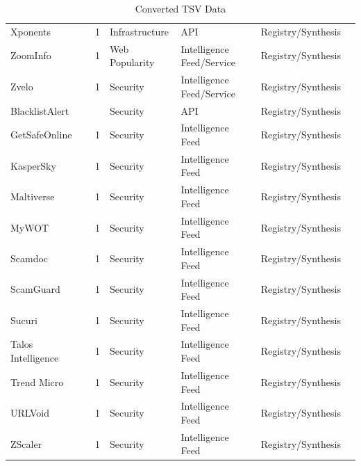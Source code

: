 \begin{table}[h!]
\begin{tabular}{lllllll}
Xponents & \cite{xponent} & 1 & Infrastructure & API & Registry/Synthesis & \cite{10.1145/3618257.3624816} \\
ZoomInfo & \cite{zoominfo} & 1 & Web Popularity & Intelligence Feed/Service & Registry/Synthesis & \cite{10.1145/3487552.3487853} \\
Zvelo & \cite{zvelo} & 1 & Security & Intelligence Feed/Service & Registry/Synthesis & \cite{10.1145/3487552.3487853} \\
BlacklistAlert & \cite{blacklistalert} &  & Security & API & Registry/Synthesis & \cite{10.1145/3777912.3839787} \\
GetSafeOnline & \cite{getsafeonline} & 1 & Security & Intelligence Feed & Registry/Synthesis & \cite{10.1145/3777912.3839788} \\
KasperSky & \cite{kaspersky} & 1 & Security & Intelligence Feed & Registry/Synthesis & \cite{10.1145/3777912.3839789} \\
Maltiverse & \cite{maltiverse} & 1 & Security & Intelligence Feed & Registry/Synthesis & \cite{10.1145/3777912.3839790} \\
MyWOT & \cite{mywot} & 1 & Security & Intelligence Feed & Registry/Synthesis & \cite{10.1145/3777912.3839791} \\
Scamdoc & \cite{scamdoc} & 1 & Security & Intelligence Feed & Registry/Synthesis & \cite{10.1145/3777912.3839792} \\
ScamGuard & \cite{scamguard} & 1 & Security & Intelligence Feed & Registry/Synthesis & \cite{10.1145/3777912.3839793} \\
Sucuri & \cite{sucuri} & 1 & Security & Intelligence Feed & Registry/Synthesis & \cite{10.1145/3777912.3839795} \\
Talos Intelligence & \cite{talos} & 1 & Security & Intelligence Feed & Registry/Synthesis & \cite{10.1145/3777912.3839796} \\
Trend Micro & \cite{TrendMicro} & 1 & Security & Intelligence Feed & Registry/Synthesis & \cite{10.1145/3777912.3839797} \\
URLVoid & \cite{urlvoid} & 1 & Security & Intelligence Feed & Registry/Synthesis & \cite{10.1145/3777912.3839798} \\
ZScaler & \cite{zscaler} & 1 & Security & Intelligence Feed & Registry/Synthesis & \cite{10.1145/3777912.3839799} \\
\end{tabular}
\caption{Converted TSV Data}
\label{tab:tsv_data}
\end{table}
